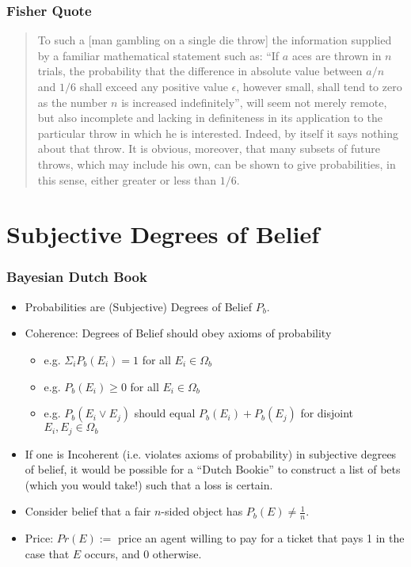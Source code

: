 \documentclass{beamer}
\begin{document}
\frame
{
\frametitle{Fisher Quote}

\begin{quote}
    To such a [man gambling on a single die throw] the information supplied by a familiar mathematical statement such as: ``If $a$ aces are thrown in $n$ trials, the probability that the difference in absolute value between $a/n$ and $1/6$ shall exceed any positive value $\epsilon$, however small, shall tend to zero as the number $n$ is increased indefinitely'', will seem not merely remote, but also incomplete and lacking in definiteness in its application to the particular throw in which he is interested.  Indeed, by itself it says nothing about that throw.  It is obvious, moreover, that many subsets of future throws, which may include his own, can be shown to give probabilities, in this sense, either greater or less than $1/6$.  
\end{quote}



}










\section{Subjective Degrees of Belief}
\frame
{
\frametitle{Bayesian Dutch Book}

\begin{itemize}
    \item<1->  Probabilities are (Subjective) Degrees of Belief $P_b$.
    \item<2->  Coherence:  Degrees of Belief should obey axioms of probability
    \begin{itemize}
        \item<3-> e.g. $\Sigma_i P_b(E_i) = 1$ for all $E_i \in \Omega_b$ 
        \item<4-> e.g. $P_b(E_i) \geq 0$ for all $E_i \in \Omega_b$
        \item<5-> e.g. $P_b(E_i \lor E_j)$ should equal $P_b(E_i) + P_b(E_j)$ for disjoint $E_i,E_j \in \Omega_b$ 
    \end{itemize}
    \item<6->  If one is Incoherent (i.e. violates axioms of probability) in subjective degrees of belief, it would be possible for a ``Dutch Bookie'' to construct a list of bets (which you would take!) such that a loss is certain.  
    \item<7-> Consider belief that a fair $n$-sided object has $P_b(E) \neq \frac{1}{n}$.
    \item<8-> Price: $Pr(E) := $ price an agent willing to pay for a ticket that pays 1 in the case that $E$ occurs, and 0 otherwise.
\end{itemize}

}
\end{document}
